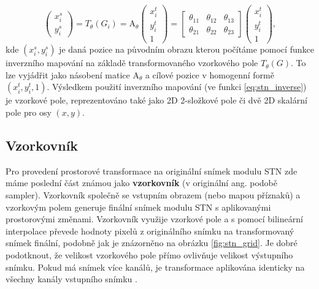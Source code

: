 \begin{equation}
\begin{pmatrix}
x_i^s \\
y_i^s
\end{pmatrix}
= T_{\theta}(G_i) = {\displaystyle \mathrm {A} }_\theta
\begin{pmatrix}
x_i^t \\
y_i^t \\
1
\end{pmatrix}
= 
\begin{bmatrix}
\theta_{11} & \theta_{12} & \theta_{13} \\
\theta_{21} & \theta_{22} & \theta_{23}
\end{bmatrix}
\begin{pmatrix}
x_i^t \\
y_i^t \\
1
\end{pmatrix},
\label{eq:stn_inverse}
\end{equation}
kde $(x_i^s, y_i^s)$ je daná pozice na původním obrazu kterou počítáme pomocí funkce inverzního mapování na základě transformovaného vzorkového pole $T_{\theta}(G)$. To lze vyjádřit jako násobení matice ${\displaystyle \mathrm {A} }_\theta$ a cílové pozice v homogenní formě $(x_i^t, y_i^t, 1)$. Výsledkem použití inverzního mapování (ve funkci \ref{eq:stn_inverse}) je vzorkové pole, reprezentováno také jako 2D 2-složkové pole či dvě 2D skalární pole pro osy $(x, y)$.

\subsection{Vzorkovník}

Pro provedení prostorové transformace na originální snímek modulu STN zde máme poslední část známou jako \textbf{vzorkovník} (v originální ang. podobě sampler). Vzorkovník společně se vstupním obrazem (nebo mapou příznaků) a vzorkovým polem generuje finální snímek modulu STN s aplikovanými prostorovými změnami. Vzorkovník využije vzorkové pole a s pomocí bilineární interpolace převede hodnoty pixelů z originálního snímku na transformovaný snímek finální, podobně jak je znázorněno na obrázku \ref{fig:stn_grid}. Je dobré podotknout, že velikost vzorkového pole přímo ovlivňuje velikost výstupního snímku. Pokud má snímek více kanálů, je transformace aplikována identicky na všechny kanály vstupního snímku \cite{stn_medium_3}.


